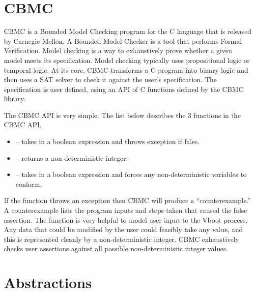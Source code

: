 \section{CBMC}

CBMC is a Bounded Model Checking program for the C language that is released by
Carnegie Mellon. 
A Bounded Model Checker is a tool that performs Formal Verification.
Model checking is a way to exhaustively prove whether a given model meets its
specification.
Model checking typically uses propositional logic or temporal logic. 
At its core, CBMC transforms a C program into binary logic and
then uses a SAT solver to check it against the user's specification. 
The specification is user defined, using an API of C functions defined by the
CBMC library. 


The CBMC API is very simple.
The list below describes the 3 functions in the CBMC API.

\begin{itemize}
    \item {} -- takes in a boolean expression and throws
        exception if false.
    \item {} -- returns a non-deterministic integer.
    \item {} -- takes in a boolean expression and forces any
        non-deterministic variables to conform.
\end{itemize}

If the  function throws an exception then CBMC will produce a ``counterexample.''
A counterexample lists the program inputs and steps taken that caused the false
assertion.
The  function is very helpful to model user input to the Vboot process.
Any data that could be modified by the user could feasibly take any
value, and this is represented cleanly by a non-deterministic integer.
CBMC exhaustively checks user assertions against all possible non-deterministic
integer values.

\section{Abstractions}

